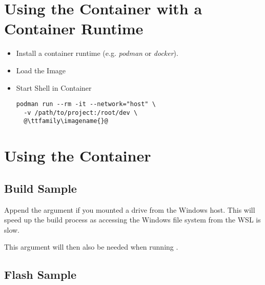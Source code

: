 \newpage

\section{Using the Container with a Container Runtime}

\begin{itemize}
\item Install a container runtime (e.g. \emph{podman} or \emph{docker}).

\item Load the Image

 {\ttfamily\imagename{}}

\item Start Shell in Container

\begin{lstlisting}
podman run --rm -it --network="host" \
  -v /path/to/project:/root/dev \
  @\ttfamily\imagename{}@
\end{lstlisting}
\end{itemize}

\newpage

\section{Using the Container}

\subsection{Build Sample}



\begin{infobox}
  Append the  argument if you mounted a drive from
  the Windows host. This will speed up the build process as accessing the
  Windows file system from the WSL is slow.


  This argument will then also be needed when running \mono{west flash}.
\end{infobox}

\subsection{Flash Sample}

